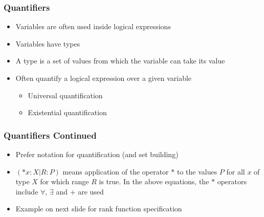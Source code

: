 \documentclass[t,12pt,numbers,fleqn]{beamer}
\begin{document}

\begin{frame}
\frametitle{Quantifiers}
\begin{itemize}
\item Variables are often used inside logical expressions
\item Variables have types
\item A type is a set of values from which the variable can take its value
\item Often quantify a logical expression over a given variable
\begin{itemize}
\item Universal quantification
\item Existential quantification
\end{itemize}
\end{itemize}
\end{frame}


\begin{frame}
\frametitle{Quantifiers Continued}

\begin{itemize}
\item Prefer \cite[p.\ 143]{GriesAndSchneider1993} notation for quantification
  (and set building)
\item $(*x: X | R : P)$ means application of the operator $*$ to the values $P$ for
all $x$ of type $X$ for which range $R$ is true.  In the above equations, the
$*$ operators include $\forall$, $\exists$ and $+$ are used
\item Example on next slide for rank function specification
\end{itemize}

\end{frame}

\end{document}
